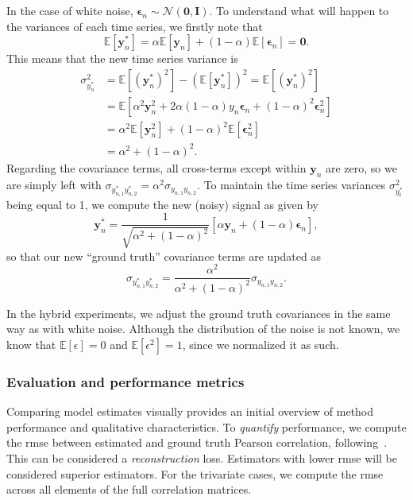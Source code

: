 In the case of white noise, $\mathbf{\epsilon}_n \sim \mathcal{N}(\mathbf{0}, \mathbf{I})$.
To understand what will happen to the variances of each time series, we firstly note that
\begin{equation}
  \mathbb{E}[\mathbf{y}_n^*] = \alpha \mathbb{E}[\mathbf{y}_n] + (1-\alpha)\mathbb{E}[\mathbf{\epsilon}_n] = \mathbf{0}.
\end{equation}
This means that the new time series variance is
\begin{equation}
  \begin{split}
    \sigma_{y_n^*}^2 & = \mathbb{E}[(\mathbf{y}_n^*)^2] - (\mathbb{E}[\mathbf{y}_n^*])^2 = \mathbb{E}[(\mathbf{y}_n^*)^2] \\
    & = \mathbb{E}[\alpha^2 \mathbf{y}_n^2 + 2\alpha(1-\alpha)y_n\mathbf{\epsilon}_n + (1-\alpha)^2\mathbf{\epsilon}_n^2] \\
    & = \alpha^2\mathbb{E}[\mathbf{y}_n^2] + (1-\alpha)^2\mathbb{E}[\mathbf{\epsilon}_n^2] \\
    & = \alpha^2 + (1-\alpha)^2.
  \end{split}
\end{equation}
Regarding the covariance terms, all cross-terms except within $\mathbf{y}_n$ are zero, so we are simply left with $\sigma_{y_{n,1}^*y_{n,2}^*} = \alpha^2\sigma_{y_{n,1}y_{n,2}}$.
To maintain the time series variances $\sigma_{y_t^*}^2$ being equal to 1, we compute the new (noisy) signal as given by
\begin{equation}
  \mathbf{y}_n^* = \frac{1}{\sqrt{\alpha^2 + (1-\alpha)^2}} [\alpha \mathbf{y}_n + (1 - \alpha) \mathbf{\epsilon}_n],
\end{equation}
so that our new ``ground truth'' covariance terms are updated as
\begin{equation}
  \sigma_{y_{n,1}^*y_{n,2}^*} = \frac{\alpha^2}{\alpha^2 + (1-\alpha)^2} \sigma_{y_{n,1}y_{n,2}}.
\end{equation}

In the hybrid experiments, we adjust the ground truth covariances in the same way as with white noise.
Although the distribution of the noise is not known, we know that $\mathbb{E}[\epsilon] = 0$ and $\mathbb{E}[\epsilon^2] = 1$, since we normalized it as such.

\subsubsection{Evaluation and performance metrics}

Comparing model estimates visually provides an initial overview of method performance and qualitative characteristics.
To \emph{quantify} performance, we compute the \gls{rmse} between estimated and ground truth Pearson correlation, following~\textcite{Wilson2010, Lindquist2014}.
This can be considered a \emph{reconstruction} loss.
Estimators with lower \gls{rmse} will be considered superior estimators.
For the trivariate cases, we compute the \gls{rmse} across all elements of the full correlation matrices.

